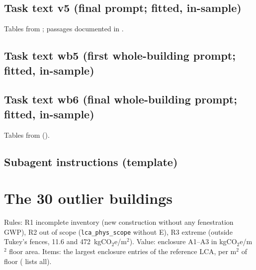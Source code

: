 \documentclass[10pt,letterpaper]{article}
\newcommand{\coe}{kgCO$_2$e/m$^2$}
\begin{document}
\subsection{Task text v5 (final prompt; fitted, in-sample)}
\label{app:v5}
Tables from ; passages documented in .

\subsection{Task text wb5 (first whole-building prompt; fitted, in-sample)}

\subsection{Task text wb6 (final whole-building prompt; fitted, in-sample)}
Tables from  ().

\subsection{Subagent instructions (template)}


\section{The 30 outlier buildings}
\label{app:outliers}
Rules: R1 incomplete inventory (new construction without any fenestration GWP), R2 out of scope (\texttt{lca\_phys\_scope} without E), R3 extreme (outside Tukey's fences, 11.6 and 472~\coe). Value: enclosure A1--A3 in \coe{} floor area. Items: the largest enclosure entries of the reference LCA, per m$^2$ of floor ( lists all).
\end{document}
